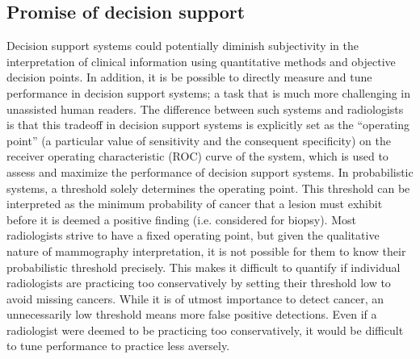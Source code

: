 \subsection{Promise of decision support}
Decision support systems could potentially diminish subjectivity in the interpretation of clinical information using quantitative methods and objective decision points. In addition, it is be possible to directly measure and tune performance in decision support systems; a task that is much more challenging in unassisted human readers. The difference between such systems and radiologists is that this tradeoff in decision support systems is explicitly set as the ``operating point'' (a particular value of sensitivity and the consequent specificity) on the receiver operating characteristic (ROC) curve of the system, which is used to assess and maximize the performance of decision support systems. In probabilistic systems, a threshold solely determines the operating point. This threshold can be interpreted as the minimum probability of cancer that a lesion must exhibit before it is deemed a positive finding (i.e. considered for biopsy). Most radiologists strive to have a fixed operating point, but given the qualitative nature of mammography interpretation, it is not possible for them to know their probabilistic threshold precisely. This makes it difficult to quantify if individual radiologists are practicing too conservatively by setting their threshold low to avoid missing cancers. While it is of utmost importance to detect cancer, an unnecessarily low threshold means more false positive detections. Even if a radiologist were deemed to be practicing too conservatively, it would be difficult to tune performance to practice less aversely.












